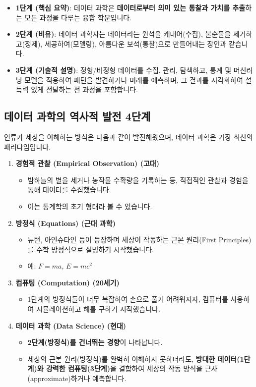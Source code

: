 \documentclass[11pt,a4paper]{book}
\theoremstyle{definition}
\begin{document}
\begin{itemize}
    \item \textbf{1단계 (핵심 요약)}: 데이터 과학은 \textbf{데이터로부터 의미 있는 통찰과 가치를 추출}하는 모든 과정을 다루는 융합 학문입니다.
    \item \textbf{2단계 (비유)}: 데이터 과학자는 데이터라는 원석을 캐내어(수집), 불순물을 제거하고(정제), 세공하여(모델링), 아름다운 보석(통찰)으로 만들어내는 장인과 같습니다.
    \item \textbf{3단계 (기술적 설명)}: 정형/비정형 데이터를 수집, 관리, 탐색하고, 통계 및 머신러닝 모델을 적용하여 패턴을 발견하거나 미래를 예측하며, 그 결과를 시각화하여 설득력 있게 전달하는 전 과정을 포함합니다.
\end{itemize}

\subsection{데이터 과학의 역사적 발전 4단계}
인류가 세상을 이해하는 방식은 다음과 같이 발전해왔으며, 데이터 과학은 가장 최신의 패러다임입니다.

\begin{enumerate}
    \item \textbf{경험적 관찰 (Empirical Observation) (고대)}
    \begin{itemize}
        \item 밤하늘의 별을 세거나 농작물 수확량을 기록하는 등, 직접적인 관찰과 경험을 통해 데이터를 수집했습니다.
        \item 이는 통계학의 초기 형태라 볼 수 있습니다.
    \end{itemize}
    \item \textbf{방정식 (Equations) (근대 과학)}
    \begin{itemize}
        \item 뉴턴, 아인슈타인 등이 등장하며 세상이 작동하는 근본 원리(First Principles)를 수학 방정식으로 설명하기 시작했습니다.
        \item 예: $F=ma$, $E=mc^2$
    \end{itemize}
    \item \textbf{컴퓨팅 (Computation) (20세기)}
    \begin{itemize}
        \item 1단계의 방정식들이 너무 복잡하여 손으로 풀기 어려워지자, 컴퓨터를 사용하여 시뮬레이션하고 해를 구하기 시작했습니다.
    \end{itemize}
    \item \textbf{데이터 과학 (Data Science) (현대)}
    \begin{itemize}
        \item \textbf{2단계(방정식)를 건너뛰는 경향}이 나타납니다.
        \item 세상의 근본 원리(방정식)를 완벽히 이해하지 못하더라도, \textbf{방대한 데이터(1단계)와 강력한 컴퓨팅(3단계)}을 결합하여 세상의 작동 방식을 근사(approximate)하거나 예측합니다.
    \end{itemize}
\end{enumerate}
\end{document}

